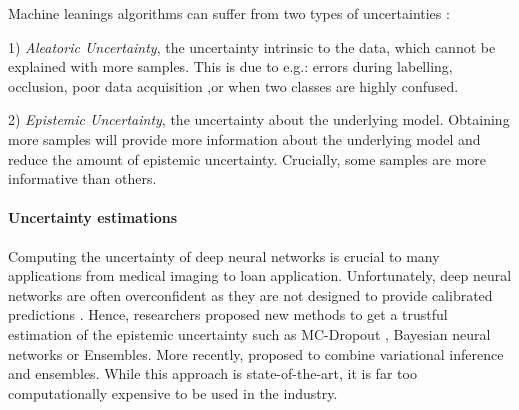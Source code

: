 \documentclass{article}
\begin{document}
Machine leanings algorithms can suffer from two types of uncertainties \citep{kendall2017uncertainties}:

1) \emph{Aleatoric Uncertainty}, the uncertainty intrinsic to the data, which cannot be explained with more samples. This is due to e.g.: errors during labelling, occlusion, poor data acquisition ,or when two classes are highly confused. 

2) \emph{Epistemic Uncertainty}, the uncertainty about the underlying model. Obtaining more samples will provide more information about the underlying model and reduce the amount of epistemic uncertainty. Crucially, some samples are more informative than others. 

\paragraph{Uncertainty estimations} 
Computing the uncertainty of deep neural networks is crucial to many applications from medical imaging to loan application. Unfortunately, deep neural networks are often overconfident as they are not designed to provide calibrated predictions \citep{scalia2019evaluating,gal2016uncertainty}. Hence, researchers proposed new methods to get a trustful estimation of the epistemic uncertainty such as MC-Dropout \citep{gal2016dropout}, Bayesian neural networks \citep{blundell2015weight} or Ensembles. More recently, \citet{wilson2020bayesian} proposed to combine variational inference and ensembles. While this approach is state-of-the-art, it is far too computationally expensive to be used in the industry.
\end{document}
